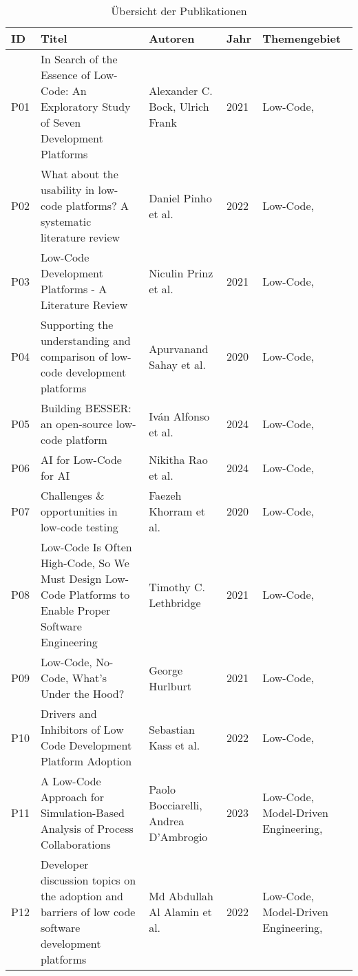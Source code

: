 \begin{longtable}{|m{0.8cm}|m{4.4cm}|m{3cm}|m{0.8cm}|m{4cm}|}
    \caption{Übersicht der Publikationen} 
    \label{tab:publikationen} \\
    \hline
    \textbf{ID} & \textbf{Titel} & \textbf{Autoren} & \textbf{Jahr} & \textbf{Themengebiet} \\
    \hline
    \endhead
    P01 & In Search of the Essence of Low-Code: An Exploratory Study of Seven Development Platforms & Alexander C. Bock, Ulrich Frank \cite{Bock_2021_essence} & 2021 & Low-Code,  \\ \hline
    P02 & What about the usability in low-code platforms? A systematic literature review & Daniel Pinho et al. \cite{Pinho_2022} & 2022 & Low-Code,  \\ \hline
    P03 & Low-Code Development Platforms - A Literature Review & Niculin Prinz et al. \cite{Prinz_2021} & 2021 & Low-Code,  \\ \hline
    P04 & Supporting the understanding and comparison of low-code development platforms & Apurvanand Sahay et al. \cite{Sahay_2020} & 2020 & Low-Code,  \\ \hline
    P05 & Building BESSER: an open-source low-code platform & Iván Alfonso et al. \cite{alfonso2024building} & 2024 & Low-Code,  \\ \hline
    P06 & AI for Low-Code for AI & Nikitha Rao et al. \cite{rao2024} & 2024 & Low-Code,  \\ \hline
    P07 & Challenges \& opportunities in low-code testing & Faezeh Khorram et al. \cite{Khorram_2020} & 2020 & Low-Code,  \\ \hline
    P08 & Low-Code Is Often High-Code, So We Must Design Low-Code Platforms to Enable Proper Software Engineering & Timothy C. Lethbridge \cite{lethbridge2021low} & 2021 & Low-Code,  \\ \hline
    P09 & Low-Code, No-Code, What's Under the Hood? & George Hurlburt \cite{Hurlburt_2021} & 2021 & Low-Code,  \\ \hline
    P10 & Drivers and Inhibitors of Low Code Development Platform Adoption & Sebastian Kass et al. \cite{Kass_2022} & 2022 & Low-Code,  \\ \hline
    P11 & A Low-Code Approach for Simulation-Based Analysis of Process Collaborations & Paolo Bocciarelli, Andrea D'Ambrogio \cite{Bocciarelli_2023} & 2023 & Low-Code, Model-Driven Engineering,  \\ \hline
    P12 & Developer discussion topics on the adoption and barriers of low code software development platforms & Md Abdullah Al Alamin et al. \cite{Alamin_2022} & 2022 & Low-Code, Model-Driven Engineering,  \\ \hline

\end{longtable}

